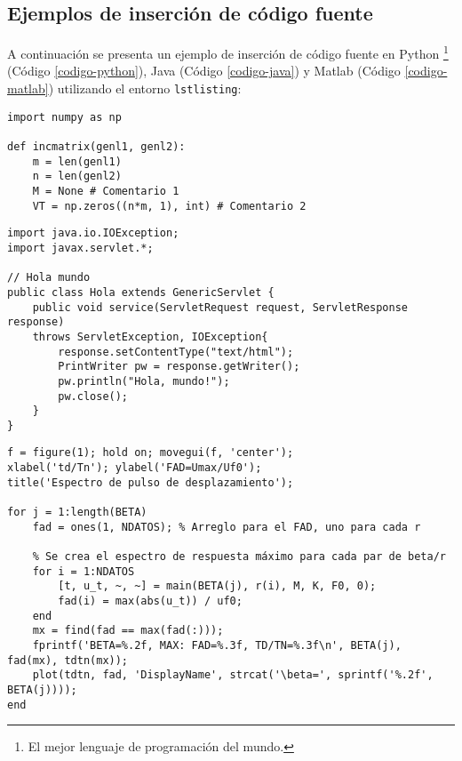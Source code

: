 		\lipsum[4]
		
		\begin{multicols}{2}
			
			\lipsum[4]
			
			
			\lipsum[1]
			
		\end{multicols}
		
	\subsection{Ejemplos de inserción de código fuente}
		
		A continuación se presenta un ejemplo de inserción de código fuente en Python \footnote{El mejor lenguaje de programación del mundo.} (Código \ref{codigo-python}), Java (Código \ref{codigo-java}) y Matlab (Código \ref{codigo-matlab}) utilizando el entorno \texttt{lstlisting}:
		
\begin{lstlisting}[style=Python, caption={Ejemplo en Python.\label{codigo-python}}]
import numpy as np

def incmatrix(genl1, genl2):
	m = len(genl1)
	n = len(genl2)
	M = None # Comentario 1
	VT = np.zeros((n*m, 1), int) # Comentario 2
\end{lstlisting}

\begin{lstlisting}[style=Java, caption={Ejemplo en Java.\label{codigo-java}}]
import java.io.IOException; 
import javax.servlet.*;

// Hola mundo
public class Hola extends GenericServlet {
	public void service(ServletRequest request, ServletResponse response)
	throws ServletException, IOException{
		response.setContentType("text/html");
		PrintWriter pw = response.getWriter();
		pw.println("Hola, mundo!");
		pw.close();
	}
}
\end{lstlisting}

\begin{lstlisting}[style=Matlab, caption={Ejemplo en Matlab.\label{codigo-matlab}}]
% Se crea gráfico
f = figure(1); hold on; movegui(f, 'center');
xlabel('td/Tn'); ylabel('FAD=Umax/Uf0');
title('Espectro de pulso de desplazamiento');

for j = 1:length(BETA)
	fad = ones(1, NDATOS); % Arreglo para el FAD, uno para cada r
	
	% Se crea el espectro de respuesta máximo para cada par de beta/r
	for i = 1:NDATOS
		[t, u_t, ~, ~] = main(BETA(j), r(i), M, K, F0, 0);
		fad(i) = max(abs(u_t)) / uf0;
	end
	mx = find(fad == max(fad(:)));
	fprintf('BETA=%.2f, MAX: FAD=%.3f, TD/TN=%.3f\n', BETA(j), fad(mx), tdtn(mx));
	plot(tdtn, fad, 'DisplayName', strcat('\beta=', sprintf('%.2f', BETA(j))));
end
\end{lstlisting}


